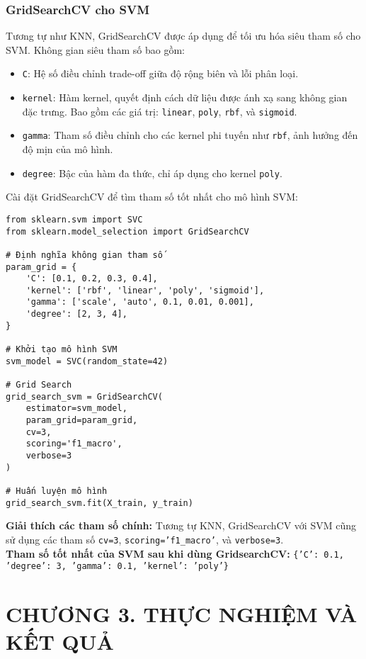 \documentclass[a4paper,12pt]{article}
\begin{document}
\subsubsection{GridSearchCV cho SVM}  
\hspace{5mm}Tương tự như KNN, GridSearchCV được áp dụng để tối ưu hóa siêu tham số cho SVM. Không gian siêu tham số bao gồm:  
\begin{itemize}
    \item \texttt{C}: Hệ số điều chỉnh trade-off giữa độ rộng biên và lỗi phân loại.
    \item \texttt{kernel}: Hàm kernel, quyết định cách dữ liệu được ánh xạ sang không gian đặc trưng. Bao gồm các giá trị: \texttt{linear}, \texttt{poly}, \texttt{rbf}, và \texttt{sigmoid}.
    \item \texttt{gamma}: Tham số điều chỉnh cho các kernel phi tuyến như \texttt{rbf}, ảnh hưởng đến độ mịn của mô hình.
    \item \texttt{degree}: Bậc của hàm đa thức, chỉ áp dụng cho kernel \texttt{poly}.
\end{itemize}

Cài đặt GridSearchCV để tìm tham số tốt nhất cho mô hình SVM:

\begin{verbatim}
from sklearn.svm import SVC
from sklearn.model_selection import GridSearchCV

# Định nghĩa không gian tham số
param_grid = {
    'C': [0.1, 0.2, 0.3, 0.4],
    'kernel': ['rbf', 'linear', 'poly', 'sigmoid'],
    'gamma': ['scale', 'auto', 0.1, 0.01, 0.001],
    'degree': [2, 3, 4],
}

# Khởi tạo mô hình SVM
svm_model = SVC(random_state=42)

# Grid Search
grid_search_svm = GridSearchCV(
    estimator=svm_model,
    param_grid=param_grid,
    cv=3,
    scoring='f1_macro',
    verbose=3
)

# Huấn luyện mô hình
grid_search_svm.fit(X_train, y_train)
\end{verbatim}

\noindent \textbf{Giải thích các tham số chính:}  
Tương tự KNN, GridSearchCV với SVM cũng sử dụng các tham số \texttt{cv=3}, \texttt{scoring='f1\_macro'}, và \texttt{verbose=3}.\\[2mm]
\noindent \textbf{Tham số tốt nhất của SVM sau khi dùng GridsearchCV:} \texttt{\{'C': 0.1, 'degree': 3, 'gamma': 0.1, 'kernel': 'poly'\}}

\newpage
\section*{\centering CHƯƠNG 3. THỰC NGHIỆM VÀ KẾT QUẢ}
\vspace{1cm}
\setcounter{section}{3}
\setcounter{subsection}{0}
\end{document}

